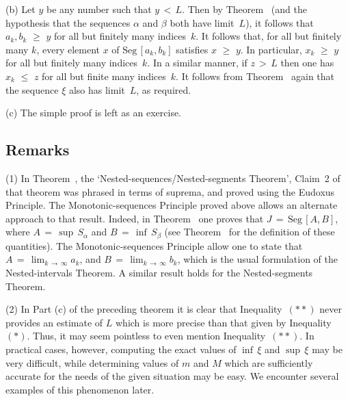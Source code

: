         (b) Let $y$ be any number such that $y\,<\,L$. Then by Theorem~
    (and the hypothesis that the sequences ${\alpha}$ and ${\beta}$ both have limit~$L$),
    it follows that $a_{k}, b_{k}\,\,{\geq}\,\,y$ for all but finitely many indices~$k$.
    It follows that, for all but finitely many $k$, every element $x$ of $\mbox{Seg}\,[a_{k}, b_{k}]$ satisfies $x\,\,{\geq}\,\,y$.
    In particular, $x_{k}\,\,{\geq}\,\,y$ for all but finitely many indices~$k$. In a similar manner, if $z\,>\,L$ then one has $x_{k}\,\,{\leq}\,\,z$ for all but finite many indices~$k$.
    It follows from Theorem~ again that the sequence ${\xi}$ also has limit~$L$, as required.

\V

        (c) The simple proof is left as an exercise.


\VV

            \subsection{\small{\bf Remarks}}
            \label{RemrkC20.10BB}

\V

\hspace*{\parindent}(1) In Theorem~, the `Nested-sequences/Nested-segments Theorem',
    Claim~2 of that theorem was phrased in terms of suprema, and proved using the Eudoxus Principle.
    The Monotonic-sequences Principle proved above allows an alternate approach to that result.
    Indeed, in Theorem~ one proves that $J \,=\, \mbox{Seg}\,[A,B]$,
    where $A \,=\, {\sup}\,S_{{\alpha}}$ and $B \,=\, {\inf}\,S_{{\beta}}$ (see Theorem~ for the definition of these quantities).
    The Monotonic-sequences Principle allow one to state that $A \,=\, \lim_{k \,{\rightarrow}\, {\infty}} a_{k}$,
    and $B \,=\, \lim_{k \,{\rightarrow}\, {\infty}} b_{k}$, which is the usual formulation of the Nested-intervals Theorem.
    A similar result holds for the Nested-segments Theorem.

\V

        (2) In Part (c) of the preceding theorem it is clear that Inequality~$({\ast}{\ast})$ never provides an estimate of $L$
    which is more precise than that given by Inequality~$({\ast})$. Thus, it may seem pointless to even mention Inequality~$({\ast}{\ast})$.
    In practical cases, however, computing the exact values of ${\inf}\,{\xi}$ and ${\sup}\,{\xi}$ may be very difficult,
    while determining values of $m$ and $M$ which are sufficiently accurate for the needs of the given situation may be easy.
    We encounter several examples of this phenomenon later.

